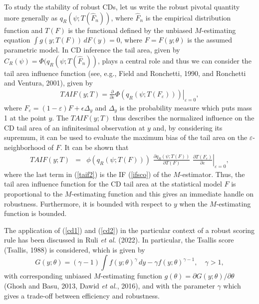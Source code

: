 \documentclass[preprint,12pt,authoryear]{elsarticle}
\begin{document}
To study the stability of robust CDs, let us write the robust pivotal quantity more generally as $q_R (\psi; T(\hat{F}_n))$, where $\hat{F}_n$ is the empirical distribution function and $T(F)$ is the functional defined by the unbiased $M$-estimating equation $\int g(y;T(F)) \, dF(y)=0$, where $F=F(y;\theta)$ is the assumed parametric model. 
In CD  inference  the tail area, given by $C_R(\psi)  = \Phi (q_R (\psi; T(\hat{F}_n))$, plays a central role and thus  we can consider the tail area influence function (see, e.g., Field and Ronchetti, 1990, and Ronchetti and Ventura, 2001), given by
\begin{eqnarray}
TAIF(y;T) = \left. \frac{\partial}{\partial \varepsilon} \Phi (q_R (\psi; T(F_\varepsilon))) \right|_{\varepsilon=0},
\label{taif}
\end{eqnarray}
where $F_\varepsilon = (1-\varepsilon) F + \epsilon \Delta_y$ and $\Delta_y$ is the probability measure which puts mass 1 at the point $y$. The $TAIF(y;T)$ thus describes the normalized influence on the CD tail area of an infinitesimal observation at $y$ and,  by considering its supremum, it can be used to evaluate the maximum bias of the tail area on the $\varepsilon$-neighborhood of $F$. It can be shown that
\begin{eqnarray}
TAIF(y;T) & = &  \phi(q_R(\psi;T(F))) \, \, \frac{\partial q_R(\psi;T(F))}{\partial T(F)} \, \, \left. \frac{\partial T(F_\varepsilon)}{\partial \varepsilon} \right|_{\varepsilon=0},
\label{taif2}
\end{eqnarray}
where the last term in (\ref{taif2}) is the IF (\ref{ifsco}) of the $M$-estimator. Thus, the tail area influence function for the CD tail area at the statistical model $F$ is proportional to the $M$-estimating function and this gives an immediate  handle on robustness. Furthermore, it  is bounded with respect to $y$ when the $M$-estimating function is bounded. 


The application of (\ref{cd1}) and (\ref{cd2}) in the particular context of a robust scoring rule has been discussed in Ruli {\em et al.} (2022). In particular, the Tsallis score (Tsallis, 1988) is considered, which is given by
\begin{equation*}
  \label{eq:tsallisscore}
  G(y;\theta) = (\gamma - 1) \int\!  f(y;\theta)^\gamma \, d y - \gamma f(y;\theta)^{\gamma-1},
  \quad \gamma>1,
\end{equation*}
with corresponding unbiased $M$-estimating function $g(\theta)=\partial G(y;\theta)/\partial \theta$ (Ghosh and Basu, 2013, Dawid {\em et al.}, 2016), and with the parameter $\gamma$ which gives a trade-off between efficiency and robustness. 
\end{document}
